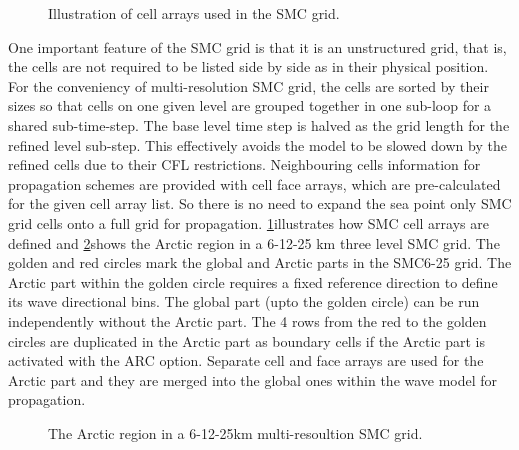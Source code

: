\begin{figure} \begin{center}
\caption{Illustration of cell arrays used in the SMC grid.}
\label{fig:SMCells} \botline
\end{center}
\end{figure}

One important feature of the SMC grid is that it is an unstructured
grid, that is, the cells are not required to be listed side by side
as in their physical position. For the conveniency of multi-resolution
SMC grid, the cells are sorted by their sizes so that cells on one
given level are grouped together in one sub-loop for a shared sub-time-step.
The base level time step is halved as the grid length for the refined
level sub-step. This effectively avoids the model to be slowed down
by the refined cells due to their CFL restrictions. Neighbouring cells
information for propagation schemes are provided with cell face arrays,
which are pre-calculated for the given cell array list. So there is
no need to expand the sea point only SMC grid cells onto a full grid
for propagation. \ref{fig:SMCells}illustrates how SMC cell arrays
are defined and \ref{fig:SMC_Arctic}shows the Arctic region in a
6-12-25 km three level SMC grid. The golden and red circles mark the
global and Arctic parts in the SMC6-25 grid. The Arctic part within
the golden circle requires a fixed reference direction to define its
wave directional bins. The global part (upto the golden circle) can
be run independently without the Arctic part. The 4 rows from the
red to the golden circles are duplicated in the Arctic part as boundary
cells if the Arctic part is activated with the ARC option. Separate
cell and face arrays are used for the Arctic part and they are merged
into the global ones within the wave model for propagation.

\begin{figure} \begin{center}
\caption{The Arctic region in a 6-12-25km multi-resoultion SMC grid.}
\label{fig:SMC_Arctic} \botline
\end{center}
\end{figure}

